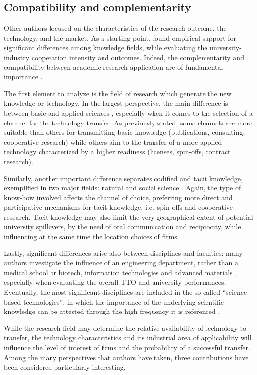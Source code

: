 \subsection{Compatibility and complementarity}

Other authors focused on the characteristics of the research outcome, the technology, and the market. As a starting point, \citet{Tijssen2006} found empirical support for significant differences among knowledge fields, while evaluating the university-industry cooperation intensity and outcomes. Indeed, the complementarity and compatibility between academic research application are of fundamental importance \citep{Geuna2009}.

The first element to analyze is the field of research which generate the new knowledge or technology. In the largest perspective, the main difference is between basic and applied sciences \citep{DEste2007}, especially when it comes to the selection of a channel for the technology transfer. As previously stated, some channels are more suitable than others for transmitting basic knowledge (publications, consulting, cooperative research) while others aim to the transfer of a more applied technology characterized by a higher readiness (licenses, spin-offs, contract research).

Similarly, another important difference separates codified and tacit knowledge, exemplified in two major fields: natural and social science \citep{Audretsch2004}. Again, the type of know-how involved affects the channel of choice, preferring more direct and participative mechanisms for tacit knowledge, i.e.\ spin-offs and cooperative research. Tacit knowledge may also limit the very geographical extent of potential university spillovers, by the need of oral communication and reciprocity, while influencing at the same time the location choices of firms.

Lastly, significant differences arise also between disciplines and faculties: many authors investigate the influence of an engineering department, rather than a medical school or biotech, information technologies and advanced materials \citep{DEste2007}, especially when evaluating the overall TTO and university performances. Eventually, the most significant disciplines are included in the so-called \enquote{science-based technologies}, in which the importance of the underlying scientific knowledge can be attested through the high frequency it is referenced \citep{Debackere2005}.

While the research field may determine the relative availability of technology to transfer, the technology characteristics and its industrial area of applicability will influence the level of interest of firms and the probability of a successful transfer. Among the many perspectives that authors have taken, three contributions have been considered particularly interesting.

